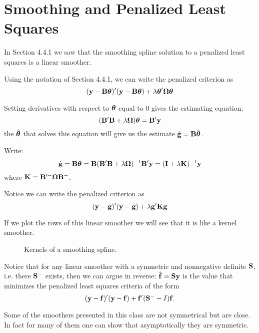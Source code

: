 \section{Smoothing and Penalized Least Squares }
In Section 4.4.1 we saw that the smoothing spline solution to a
penalized least squares is a linear smoother.

Using the notation of Section 4.4.1, we can write the penalized
criterion as 
\[
({\mathbf y} - {\mathbf B}\mbox{\boldmath $\theta$\unboldmath})'({\mathbf y} - {\mathbf B}\mbox{\boldmath $\theta$\unboldmath}) +
\lambda\mbox{\boldmath $\theta$\unboldmath}'\mbox{\boldmath $\Omega$\unboldmath}\mbox{\boldmath $\theta$\unboldmath}
\]

Setting derivatives with respect to $\mbox{\boldmath $\theta$\unboldmath}$ equal to 0 gives
the estimating equation:
\[
({\mathbf B}'{\mathbf B} + \lambda\mbox{\boldmath $\Omega$\unboldmath})\mbox{\boldmath $\theta$\unboldmath} = {\mathbf B}'{\mathbf y}
\]
the $\hat{\mbox{\boldmath $\theta$\unboldmath}}$ that solves this equation will give us the
estimate $\hat{{\mathbf g}} = {\mathbf B} \hat{\mbox{\boldmath $\theta$\unboldmath}}$.


Write:
\[
\hat{{\mathbf g}} = {\mathbf B} \mbox{\boldmath $\theta$\unboldmath} = {\mathbf B}({\mathbf B}'{\mathbf B} + \lambda \mbox{\boldmath $\Omega$\unboldmath})^{-1}
{\mathbf B}'{\mathbf y} =  ({\mathbf I} + \lambda {\mathbf K})^{-1}{\mathbf y}
\]
where ${\mathbf K} = {\mathbf B}'^{-} \mbox{\boldmath $\Omega$\unboldmath} {\mathbf B}^{-}$. 

Notice we can
write the penalized criterion as
\[
({\mathbf y} - {\mathbf g})'({\mathbf y} - {\mathbf g}) + \lambda {\mathbf g}' {\mathbf K} {\mathbf g}
\]

If we plot the rows of this linear smoother we will see that it is
like a kernel smoother.



\begin{figure}[htb]
\caption{Kernels of a smoothing spline.}
\begin{center}
\end{center}
\end{figure}

Notice that for any linear smoother  with a symmetric and nonnegative
definite ${\mathbf S}$, i.e. there ${\mathbf S}^{-}$ exists, then 
we can argue in reverse: $\hat{{\mathbf f}}={\mathbf S}{\mathbf y}$ is the value that minimizes the
penalized least squares criteria of the form
\[
({\mathbf y} - {\mathbf f})'({\mathbf y} - {\mathbf f}) + {\mathbf f}'({\mathbf S}^{-} - I){\mathbf f}.
\]

Some of the smoothers presented in this class are not symmetrical but
are close. In fact for many of them one can show that asymptotically
they are symmetric.




